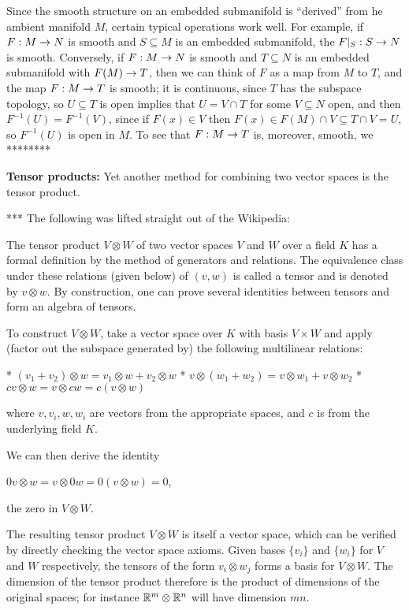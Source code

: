 \msk

Since the smooth structure on an embedded submanifold is ``derived'' from he ambient manifold $M$,
certain typical operations work well. For example, if $F:M\rightarrow N$ is smooth and
$S\subseteq M$ is an embedded submanifold, the $F|_S:S\rightarrow N$ is smooth. Conversely, if 
$F:M\rightarrow N$ is smooth and $T\subseteq N$ is an embedded submanifold with $F(M)\rightarrow T$, then
we can think of $F$ as a map from $M$ to $T$, and the map $F:M\rightarrow T$ is smooth; it is
continuous, since $T$ has the subspace topology, so $U\subseteq T$ is open
implies that $U=V\cap T$ for some $V\subseteq N$ open,
and then $F^{-1}(U)=F^{-1}(V)$, since if $F(x)\in V$ then $F(x)\in F(M)\cap V\subseteq T\cap V=U$,
so $F^{-1}(U)$ is open in $M$. To see that $F:M\rightarrow T$ is, moreover, smooth, we ********

\msk

{\bf Tensor products:} Yet another method for combining two vector spaces is the tensor 
product. 

\msk

*** The following was lifted straight out of the Wikipedia: 

\ssk

The tensor product 
$V \otimes W$ of two vector spaces $V$ and $W$ over a field $K$ 
has a formal definition by the method of generators and relations. 
The equivalence class under these relations (given below) of 
$(v,w)$ is called a tensor and is denoted by $v \otimes w$. 
By construction, one can prove several identities between tensors 
and form an algebra of tensors.

To construct $V \otimes W$, take a vector space over $K$ with basis $V \times W$ 
and apply (factor out the subspace generated by) the following multilinear relations:

    * $(v_1+v_2)\otimes w=v_1\otimes w+v_2\otimes w$
    * $v\otimes (w_1+w_2)=v\otimes w_1+v\otimes w_2$
    * $cv\otimes w=v\otimes cw=c(v\otimes w)$

where $v,v_i,w,w_i$ are vectors from the appropriate spaces, 
and $c$ is from the underlying field $K$.

We can then derive the identity

    $0v\otimes w=v\otimes 0w=0(v\otimes w)=0$,

the zero in $V \otimes W$.

The resulting tensor product $V \otimes W$ is itself a vector space, 
which can be verified by directly checking the vector space axioms. 
Given bases $\{v_i\}$ and $\{w_i\}$ for $V$ and $W$ respectively, 
the tensors of the form $v_i \otimes w_j$ forms a basis for $V \otimes W$. 
The dimension of the tensor product therefore is the product of dimensions 
of the original spaces; for instance ${\Bbb R}^m \otimes {\Bbb R}^n$ will have dimension $mn$.


